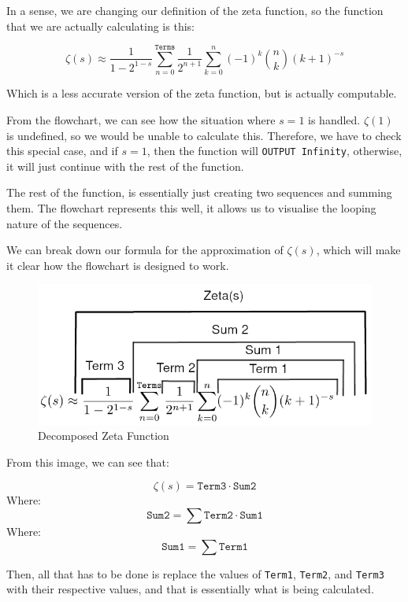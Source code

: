 \documentclass{article}
\begin{document}
In a sense, we are changing our definition of the zeta function, so the function that we are actually calculating is this:

$$\zeta(s) \approx \frac{1}{1-2^{1-s}} \sum_{n=0}^{\texttt{Terms}} \frac{1}{2^{n+1}} \sum_{k=0}^{n} (-1)^k \binom{n}{k} (k+1)^{-s} $$

Which is a less accurate version of the zeta function, but is actually computable.

From the flowchart, we can see how the situation where $s=1$ is handled. $\zeta(1)$ is undefined, so we would be unable to calculate this. Therefore, we have to check this special case, and if $s=1$, then the function will \texttt{OUTPUT Infinity}, otherwise, it will just continue with the rest of the function.

The rest of the function, is essentially just creating two sequences and summing them. The flowchart represents this well, it allows us to visualise the looping nature of the sequences.

We can break down our formula for the approximation of $\zeta(s)$, which will make it clear how the flowchart is designed to work.

\begin{figure}[h]
    \centering
    \caption{Decomposed Zeta Function}
    \captionsetup{justification=centering}
    \includegraphics[scale=0.4]{zeta-approx-explained}
\end{figure}

From this image, we can see that:

$$\zeta(s) = \texttt{Term3} \cdot \texttt{Sum2}$$
Where:
$$\texttt{Sum2} = \sum \texttt{Term2} \cdot \texttt{Sum1}$$
Where:
$$\texttt{Sum1} = \sum \texttt{Term1}$$

Then, all that has to be done is replace the values of \texttt{Term1}, \texttt{Term2}, and \texttt{Term3} with their respective values, and that is essentially what is being calculated.
\end{document}
